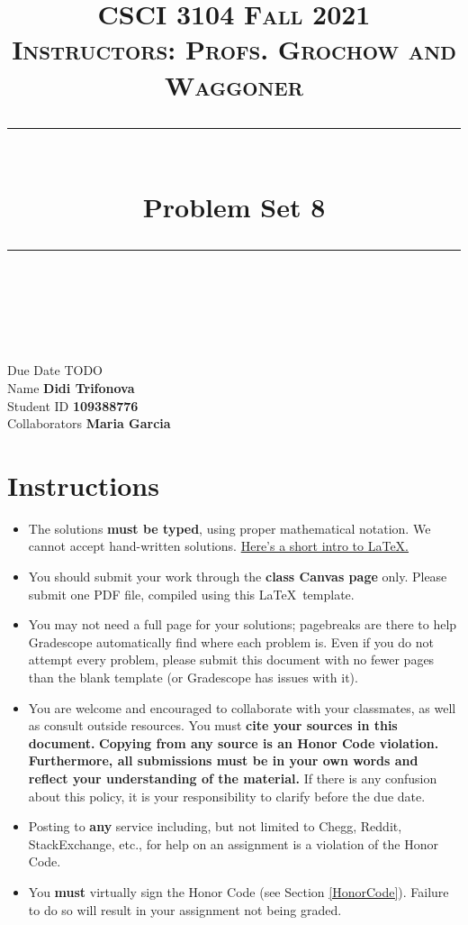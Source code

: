 \documentclass[11pt]{article}
\title{
\normalfont \normalsize 
\textsc{CSCI 3104 Fall 2021 \\ 
Instructors: Profs. Grochow and Waggoner} \\
[10pt] 
\rule{\linewidth}{0.5pt} \\[6pt] 
\huge Problem Set 8\\
\rule{\linewidth}{2pt}  \\[10pt]
}
\date{}
\theoremstyle{definition}
\theoremstyle{definition}
\theoremstyle{definition}
\begin{document}
\maketitle


\noindent
Due Date \dotfill TODO \\
Name \dotfill \textbf{Didi Trifonova} \\
Student ID \dotfill \textbf{109388776} \\
Collaborators \dotfill \textbf{Maria Garcia}

\tableofcontents

\section{Instructions}
 \begin{itemize}
	\item The solutions \textbf{must be typed}, using proper mathematical notation. We cannot accept hand-written solutions. \href{http://ece.uprm.edu/~caceros/latex/introduction.pdf}{Here's a short intro to \LaTeX.}
	\item You should submit your work through the \textbf{class Canvas page} only. Please submit one PDF file, compiled using this \LaTeX \ template.
	\item You may not need a full page for your solutions; pagebreaks are there to help Gradescope automatically find where each problem is. Even if you do not attempt every problem, please submit this document with no fewer pages than the blank template (or Gradescope has issues with it).

	\item You are welcome and encouraged to collaborate with your classmates, as well as consult outside resources. You must \textbf{cite your sources in this document.} \textbf{Copying from any source is an Honor Code violation. Furthermore, all submissions must be in your own words and reflect your understanding of the material.} If there is any confusion about this policy, it is your responsibility to clarify before the due date. 

	\item Posting to \textbf{any} service including, but not limited to Chegg, Reddit, StackExchange, etc., for help on an assignment is a violation of the Honor Code.

	\item You \textbf{must} virtually sign the Honor Code (see Section \ref{HonorCode}). Failure to do so will result in your assignment not being graded.
\end{itemize}
\end{document}

